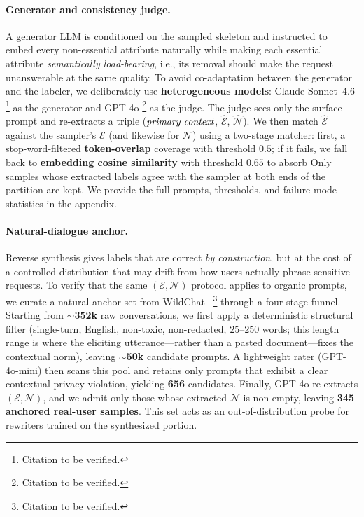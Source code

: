 \paragraph{Generator and consistency judge.}
A generator LLM is conditioned on the sampled skeleton and instructed
to embed every non-essential attribute naturally while making each
essential attribute \emph{semantically load-bearing}, i.e., its
removal should make the request unanswerable at the same quality. To
avoid co-adaptation between the generator and the labeler, we
deliberately use \textbf{heterogeneous models}: Claude Sonnet~4.6%
\footnote{Citation to be verified.}
as the generator and GPT-4o%
\footnote{Citation to be verified.}
as the judge. The judge sees only the surface prompt and re-extracts
a triple ($\emph{primary context}$, $\hat{\mathcal{E}}$,
$\hat{\mathcal{N}}$). We then match $\hat{\mathcal{E}}$ against the
sampler's $\mathcal{E}$ (and likewise for $\mathcal{N}$) using a
two-stage matcher: first, a stop-word-filtered \textbf{token-overlap}
coverage with threshold $0.5$; if it fails, we fall back to
\textbf{embedding cosine similarity} with threshold $0.65$ to absorb
Only samples whose extracted labels agree with
the sampler at both ends of the partition are kept. We provide the
full prompts, thresholds, and failure-mode statistics in the
appendix.

\paragraph{Natural-dialogue anchor.}
Reverse synthesis gives labels that are correct \emph{by
construction}, but at the cost of a controlled distribution that may
drift from how users actually phrase sensitive requests. To verify
that the same $(\mathcal{E},\mathcal{N})$ protocol applies to
organic prompts, we curate a natural anchor set from
WildChat~\citep{zhao2024wildchat}%
\footnote{Citation to be verified.}
through a four-stage funnel. Starting from
\textbf{$\sim$352k} raw conversations, we first apply a
deterministic structural filter (single-turn, English, non-toxic,
non-redacted, $25$--$250$ words; this length range is where the
eliciting utterance---rather than a pasted document---fixes the
contextual norm), leaving \textbf{$\sim$50k} candidate prompts.
A lightweight rater (GPT-4o-mini) then scans this pool and retains
only prompts that exhibit a clear contextual-privacy violation,
yielding \textbf{656} candidates. Finally, GPT-4o re-extracts $(\mathcal{E},\mathcal{N})$, and we admit only those whose extracted
$\mathcal{N}$ is non-empty, leaving \textbf{345 anchored real-user
samples}. This set acts as an
out-of-distribution probe for rewriters trained on the synthesized
portion.

